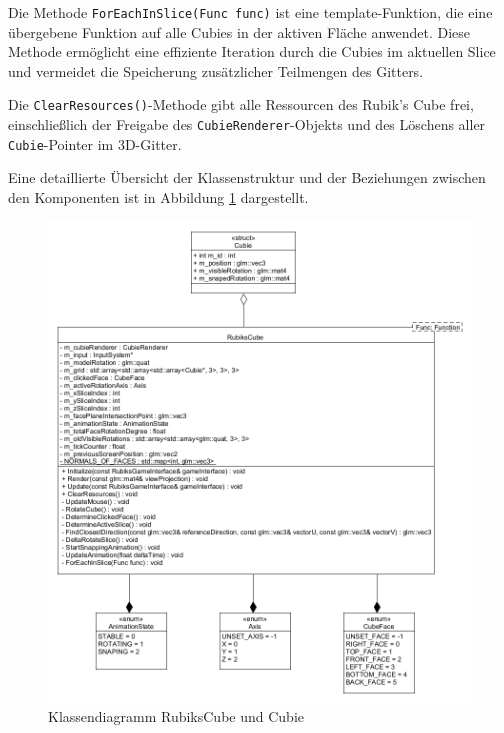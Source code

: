 Die Methode \texttt{ForEachInSlice(Func func)} ist eine  template-Funktion, die eine übergebene Funktion auf alle Cubies in der aktiven Fläche anwendet. Diese Methode ermöglicht eine effiziente Iteration durch die Cubies im aktuellen Slice und vermeidet die Speicherung zusätzlicher Teilmengen des Gitters.

Die \texttt{ClearResources()}-Methode gibt alle Ressourcen des Rubik's Cube frei, einschließlich der Freigabe des \texttt{CubieRenderer}-Objekts und des Löschens aller \texttt{Cubie}-Pointer im 3D-Gitter.

Eine detaillierte Übersicht der Klassenstruktur und der Beziehungen zwischen den Komponenten ist in Abbildung \ref{RubiksCubeClassDia} dargestellt.

\begin{figure} [H]
	\centering
	\includegraphics[scale=0.475]{images/RubiksCubeClassDia.png}
	\caption{Klassendiagramm RubiksCube und Cubie}
	\label{RubiksCubeClassDia}
\end{figure}